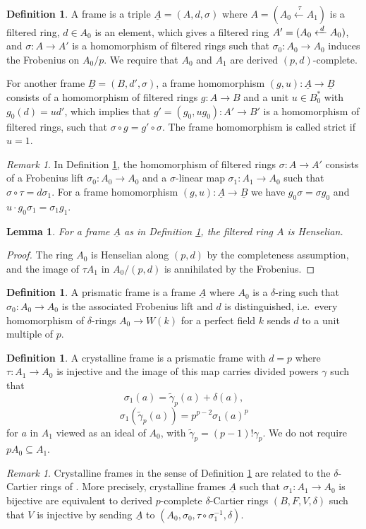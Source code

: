 \documentclass[a4paper,11pt]{amsart}
\theoremstyle{plain}
\newtheorem{Lemma}[equation]{Lemma}
\theoremstyle{definition}
\newtheorem{Defn}[equation]{Definition}
\theoremstyle{remark}
\newtheorem{Remark}[equation]{Remark}
\newcommand{\bLe}{\begin{Lemma}}
\newcommand{\eLe}{\end{Lemma}}
\newcommand{\bDe}{\begin{Defn}}
\newcommand{\eDe}{\end{Defn}}
\newcommand{\bRe}{\begin{Remark}}
\newcommand{\eRe}{\end{Remark}}
\newcommand{\bproof}{\begin{proof}}
\newcommand{\eproof}{\end{proof}}
\newcommand{\beqn}{\begin{equation}}
\newcommand{\eeqn}{\end{equation}}
\renewcommand{\u}{\underline}
\numberwithin{equation}{section}
\begin{document}
\bDe 
\label{De:frame}
A frame is a triple $\u A=(A,d,\sigma)$ where $A=(A_0\xleftarrow{\:\tau}  A_1)$ is a filtered ring, $d\in A_0$ is an element, which gives a filtered ring $A'=(A_0\xleftarrow{\:\text{\normalsize$_d$}} A_0)$, and $\sigma\colon A\to A'$ is a homomorphism of filtered rings such that $\sigma_0\colon A_0\to A_0$ induces the Frobenius on $A_0/p$. We require that $A_0$ and $A_1$ are derived $(p,d)$-complete. 

For another frame $\u B=(B,d',\sigma)$, a frame homomorphism 
$(g,u)\colon\u A\to\u B$ consists of a homomorphism of filtered rings $g\colon A\to B$ and a unit $u\in B_0^*$ with $g_0(d)=ud'$, which implies that 
$g'=(g_0,ug_0)\colon A'\to B'$ is a homomorphism of filtered rings, 
such that $\sigma\circ g=g'\circ\sigma$.
The frame homomorphism is called strict if $u=1$.
\eDe

\bRe
In Definition \ref{De:frame},
the homomorphism of filtered rings $\sigma:A\to A'$ consists of a Frobenius lift $\sigma_0:A_0\to A_0$ and a $\sigma$-linear map $\sigma_1:A_1\to A_0$ such that $\sigma\circ\tau=d\sigma_1$. For a frame homomorphism $(g,u):\u A\to\u B$ we have $g_0\sigma=\sigma g_0$ and $u\cdot g_0\sigma_1=\sigma_1g_1$.
\eRe

\bLe
\label{Le:frame-Henselian}
For a frame $\u A$ as in Definition \ref{De:frame}, the filtered ring $A$ is Henselian.
\eLe

\bproof
The ring $A_0$ is Henselian along $(p,d)$ by the completeness assumption, and the image of $\tau A_1$ in $A_0/(p,d)$ is annihilated by the Frobenius.
\eproof

\bDe 
A prismatic frame is a frame $\u A$ where $A_0$ is a $\delta$-ring such that $\sigma_0\colon A_0\to A_0$ is the associated Frobenius lift and $d$ is distinguished, i.e.\ every homomorphism of $\delta$-rings $A_0\to W(k)$ for a perfect field $k$ sends $d$ to a unit multiple of $p$.
\eDe

\bDe 
\label{De:crys-frame}
A crystalline frame is a prismatic frame with $d=p$ where $\tau:A_1\to A_0$ is injective and the image of this map carries divided powers $\gamma$ such that 
\beqn
\label{Eq:pd-frame-1}
\sigma_1(a)=\tilde\gamma_p(a)+\delta(a),
\eeqn
\beqn
\label{Eq:pd-frame-2}
\sigma_1(\tilde\gamma_p(a))=p^{p-2}\sigma_1(a)^p
\eeqn 
for $a$ in $A_1$ viewed as an ideal of $A_0$, with $\tilde\gamma_p=(p-1)!\gamma_p$. We do not require $pA_0\subseteq A_1$.
\eDe

\bRe
Crystalline frames in the sense of Definition \ref{De:crys-frame} are related to the $\delta$-Cartier rings of \cite[Definition 3.4.4]{Magidson:Witt}. More precisely, crystalline frames $\u A$ such that $\sigma_1\colon A_1\to A_0$ is bijective are equivalent to derived $p$-complete $\delta$-Cartier rings $(B,F,V,\delta)$ such that $V$ is injective by sending $\u A$ to $(A_0,\sigma_0,\tau\circ\sigma_1^{-1},\delta)$.
\eRe
\end{document}
